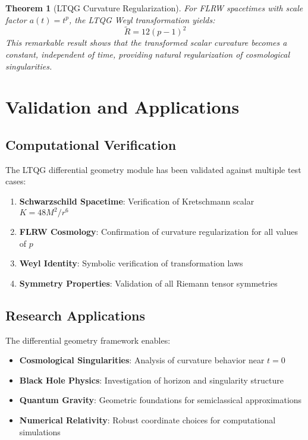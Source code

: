 \documentclass[11pt,a4paper]{article}
\newtheorem{theorem}{Theorem}[section]
\theoremstyle{definition}
\theoremstyle{remark}
\newcommand{\Scal}{R}
\renewcommand{\tilde}[1]{\widetilde{#1}}
\begin{document}
\begin{theorem}[LTQG Curvature Regularization]
For FLRW spacetimes with scale factor $a(t) = t^p$, the LTQG Weyl transformation yields:
\begin{equation}
\tilde{\Scal} = 12(p-1)^2
\end{equation}
This remarkable result shows that the transformed scalar curvature becomes a constant, independent of time, providing natural regularization of cosmological singularities.
\end{theorem}

\section{Validation and Applications}

\subsection{Computational Verification}

The LTQG differential geometry module has been validated against multiple test cases:

\begin{enumerate}
\item \textbf{Schwarzschild Spacetime}: Verification of Kretschmann scalar $K = 48M^2/r^6$
\item \textbf{FLRW Cosmology}: Confirmation of curvature regularization for all values of $p$
\item \textbf{Weyl Identity}: Symbolic verification of transformation laws
\item \textbf{Symmetry Properties}: Validation of all Riemann tensor symmetries
\end{enumerate}

\subsection{Research Applications}

The differential geometry framework enables:

\begin{itemize}
\item \textbf{Cosmological Singularities}: Analysis of curvature behavior near $t = 0$
\item \textbf{Black Hole Physics}: Investigation of horizon and singularity structure
\item \textbf{Quantum Gravity}: Geometric foundations for semiclassical approximations
\item \textbf{Numerical Relativity}: Robust coordinate choices for computational simulations
\end{itemize}
\end{document}

